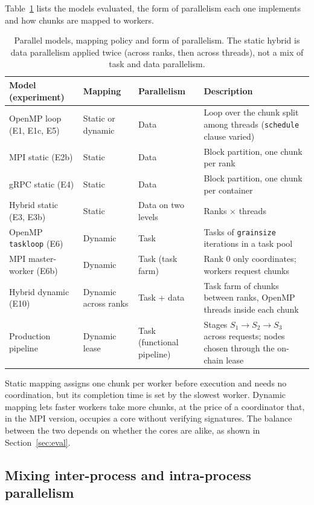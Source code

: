 \documentclass[10pt,a4paper]{article}
\begin{document}
Table~\ref{tab:models} lists the models evaluated, the form of parallelism each one implements and how chunks are mapped to workers.

\begin{table}[t]
\centering\small
\begin{tabular}{p{3.3cm}p{2.4cm}p{3.6cm}p{3.9cm}}
\toprule
\textbf{Model (experiment)} & \textbf{Mapping} & \textbf{Parallelism} & \textbf{Description} \\
\midrule
OpenMP loop (E1, E1c, E5) & Static or dynamic & Data & Loop over the chunk split among threads (\texttt{schedule} clause varied) \\
MPI static (E2b) & Static & Data & Block partition, one chunk per rank \\
gRPC static (E4) & Static & Data & Block partition, one chunk per container \\
Hybrid static (E3, E3b) & Static & Data on two levels & Ranks $\times$ threads \\
OpenMP \texttt{taskloop} (E6) & Dynamic & Task & Tasks of \texttt{grainsize} iterations in a task pool \\
MPI master-worker (E6b) & Dynamic & Task (task farm) & Rank 0 only coordinates; workers request chunks \\
Hybrid dynamic (E10) & Dynamic across ranks & Task + data & Task farm of chunks between ranks, OpenMP threads inside each chunk \\
Production pipeline & Dynamic lease & Task (functional pipeline) & Stages $S_1\to S_2\to S_3$ across requests; nodes chosen through the on-chain lease \\
\bottomrule
\end{tabular}
\caption{Parallel models, mapping policy and form of parallelism. The static hybrid is data parallelism applied twice (across ranks, then across threads), not a mix of task and data parallelism.}
\label{tab:models}
\end{table}

Static mapping assigns one chunk per worker before execution and needs no coordination, but its completion time is set by the slowest worker. Dynamic mapping lets faster workers take more chunks, at the price of a coordinator that, in the MPI version, occupies a core without verifying signatures. The balance between the two depends on whether the cores are alike, as shown in Section~\ref{sec:eval}.

\subsection{Mixing inter-process and intra-process parallelism}\label{sec:hybrid}
\end{document}
